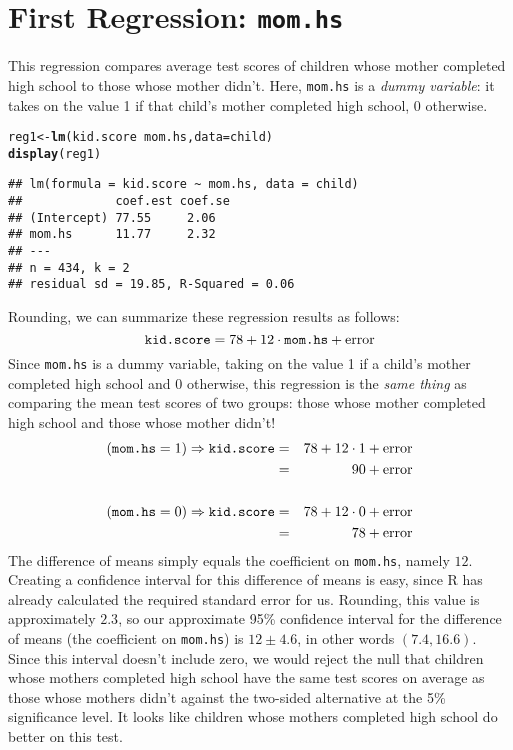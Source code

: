 \documentclass[12pt]{article}\usepackage[]{graphicx}\usepackage[]{color}
\makeatletter
\newcommand{\hlopt}[1]{\textcolor[rgb]{0,0,0}{#1}}%
\newcommand{\hlstd}[1]{\textcolor[rgb]{0.345,0.345,0.345}{#1}}%
\newcommand{\hlkwb}[1]{\textcolor[rgb]{0.69,0.353,0.396}{#1}}%
\newcommand{\hlkwc}[1]{\textcolor[rgb]{0.333,0.667,0.333}{#1}}%
\newcommand{\hlkwd}[1]{\textcolor[rgb]{0.737,0.353,0.396}{\textbf{#1}}}%
\newenvironment{kframe}{%
 \def\at@end@of@kframe{}%
 \ifinner\ifhmode%
  \def\at@end@of@kframe{\end{minipage}}%
  \begin{minipage}{\columnwidth}%
 \fi\fi%
 \def\FrameCommand##1{\hskip\@totalleftmargin \hskip-\fboxsep
 \colorbox{shadecolor}{##1}\hskip-\fboxsep
     \hskip-\linewidth \hskip-\@totalleftmargin \hskip\columnwidth}%
 \MakeFramed {\advance\hsize-\width
   \@totalleftmargin\z@ \linewidth\hsize
   \@setminipage}}%
 {\par\unskip\endMakeFramed%
 \at@end@of@kframe}
\newenvironment{knitrout}{}{} %
\makeatother
\begin{document}
\section*{First Regression: \texttt{mom.hs}}
This regression compares average test scores of children whose mother completed high school to those whose mother didn't.
Here, \texttt{mom.hs} is a \emph{dummy variable}: it takes on the value 1 if that child's mother completed high school, 0 otherwise.
\begin{knitrout}
\color{fgcolor}\begin{kframe}
\begin{alltt}
\hlstd{reg1} \hlkwb{<-} \hlkwd{lm}\hlstd{(kid.score} \hlopt{~} \hlstd{mom.hs,} \hlkwc{data} \hlstd{= child)}
\hlkwd{display}\hlstd{(reg1)}
\end{alltt}
\begin{verbatim}
## lm(formula = kid.score ~ mom.hs, data = child)
##             coef.est coef.se
## (Intercept) 77.55     2.06  
## mom.hs      11.77     2.32  
## ---
## n = 434, k = 2
## residual sd = 19.85, R-Squared = 0.06
\end{verbatim}
\end{kframe}
\end{knitrout}
Rounding, we can summarize these regression results as follows:
  $$\mbox{\texttt{kid.score}} = 78 + 12 \cdot \mbox{\texttt{mom.hs}} + \mbox{error} $$
Since \texttt{mom.hs} is a dummy variable, taking on the value 1 if a child's mother completed high school and 0 otherwise, this regression is the \emph{same thing} as comparing the mean test scores of two groups: those whose mother completed high school and those whose mother didn't! 
    \begin{eqnarray*}
      (\mbox{\texttt{mom.hs}} = 1) \Rightarrow \texttt{kid.score} &=&78 + 12 \cdot 1 +\mbox{error}\\
      &=& 90+\mbox{error} \\\\
    (\mbox{\texttt{mom.hs}} = 0) \Rightarrow\texttt{kid.score} &=& 78 + 12 \cdot 0 +\mbox{error}\\
    &=& 78 + \mbox{error}
    \end{eqnarray*}
The difference of means simply equals the coefficient on \texttt{mom.hs}, namely $12$.
Creating a confidence interval for this difference of means is easy, since R has already calculated the required standard error for us. Rounding, this value is approximately $2.3$, so our approximate 95\% confidence interval for the difference of means (the coefficient on \texttt{mom.hs}) is $12 \pm 4.6$, in other words $(7.4, 16.6)$. 
Since this interval doesn't include zero, we would reject the null that children whose mothers completed high school have the same test scores on average as those whose mothers didn't against the two-sided alternative at the 5\% significance level. 
It looks like children whose mothers completed high school do better on this test.
\end{document}
